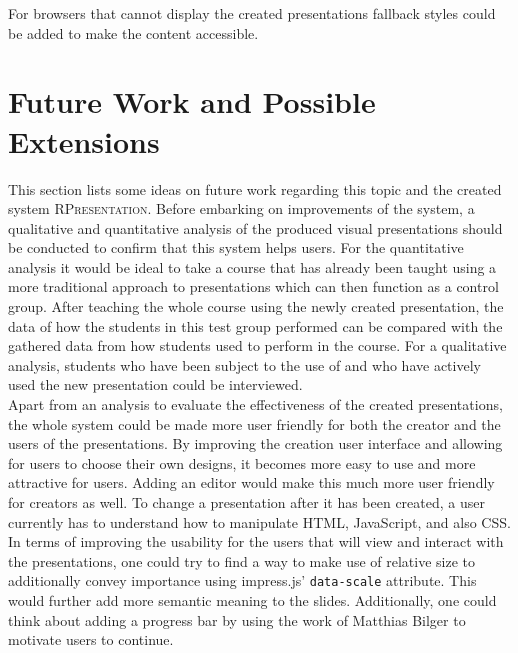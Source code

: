 \documentclass[twoside, 12pt]{article}
\newcommand{\sys}{\textsc{RPresentation}\xspace}
\begin{document}


For browsers that cannot display the created presentations fallback styles could be added to make the content accessible.


\section{Future Work and Possible Extensions}


This section lists some ideas on future work regarding this topic and the created system \sys. Before embarking on improvements of the system, a qualitative and quantitative analysis of the produced visual presentations should be conducted to confirm that this system helps users. For the quantitative analysis it would be ideal to take a course that has already been taught using a more traditional approach to presentations which can then function as a control group. After teaching the whole course using the newly created presentation, the data of how the students in this test group performed can be compared with the gathered data from how students used to perform in the course. For a qualitative analysis, students who have been subject to the use of and who have actively used the new presentation could be interviewed.\\

Apart from an analysis to evaluate the effectiveness of the created presentations, the whole system could be made more user friendly for both the creator and the users of the presentations. By improving the creation user interface and allowing for users to choose their own designs, it becomes more easy to use and more attractive for users. Adding an editor would make this much more user friendly for creators as well. To change a presentation after it has been created, a user currently has to understand how to manipulate HTML, JavaScript, and also CSS.\\

In terms of improving the usability for the users that will view and interact with the presentations, one could try to find a way to make use of relative size to additionally convey importance using impress.js' \texttt{data-scale} attribute. This would further add more semantic meaning to the slides. Additionally, one could think about adding a progress bar by using the work of Matthias Bilger \cite{bilger:npentrel15} to motivate users to continue.\\
\end{document}
